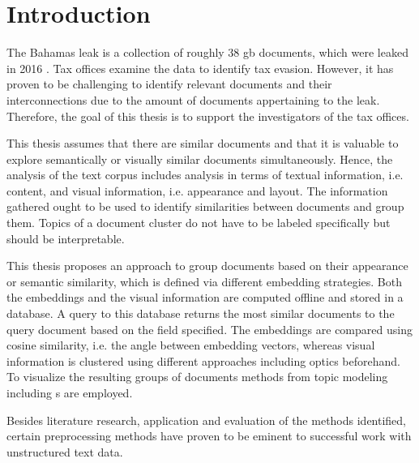 \chapter{Introduction}\label{ch:introduction}

The Bahamas leak is a collection of roughly 38 \ac{gb} documents, which were leaked in 2016 \cite{data-corpus-bahamas-leaks}.
Tax offices examine the data to identify tax evasion.
However, it has proven to be challenging to identify relevant documents and their interconnections due to the amount of documents appertaining to the leak.
Therefore, the goal of this thesis is to support the investigators of the tax offices.

This thesis assumes that there are similar documents and that it is valuable to explore semantically or visually similar documents simultaneously.
Hence, the analysis of the text corpus includes analysis in terms of textual information, i.e. content, 
and visual information, i.e. appearance and layout.
The information gathered ought to be used to identify similarities between documents and group them.
Topics of a document cluster do not have to be labeled specifically but should be interpretable.

This thesis proposes an approach to group documents based on their appearance or semantic similarity, 
which is defined via different embedding strategies.
Both the embeddings and the visual information are computed offline and stored in a database.
A query to this database returns the most similar documents to the query document based on the field specified.
The embeddings are compared using cosine similarity, i.e. the angle between embedding vectors, 
whereas visual information is clustered using different approaches including \ac{optics} beforehand.
To visualize the resulting groups of documents methods from topic modeling including \wordcloud{}s are employed.

Besides literature research, application and evaluation of the methods identified, 
certain preprocessing methods have proven to be eminent to successful work with unstructured text data.

